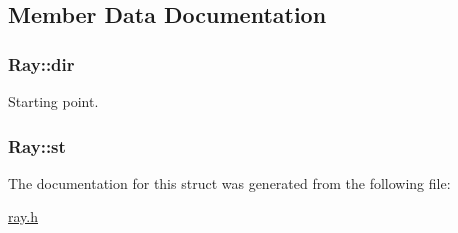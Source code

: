 \subsection{Member Data Documentation}
\subsubsection[{\texorpdfstring{dir}{dir}}]{ Ray\+::dir}\hypertarget{structRay_aea46150e156c321ab3162d4fb0d11668}{}\label{structRay_aea46150e156c321ab3162d4fb0d11668}


Starting point. 

\subsubsection[{\texorpdfstring{st}{st}}]{ Ray\+::st}\hypertarget{structRay_a74977b46b5c58c6dd7b0bd90f7220309}{}\label{structRay_a74977b46b5c58c6dd7b0bd90f7220309}


The documentation for this struct was generated from the following file\+:\begin{DoxyCompactItemize}
\item 
\hyperlink{ray_8h}{ray.\+h}\end{DoxyCompactItemize}
